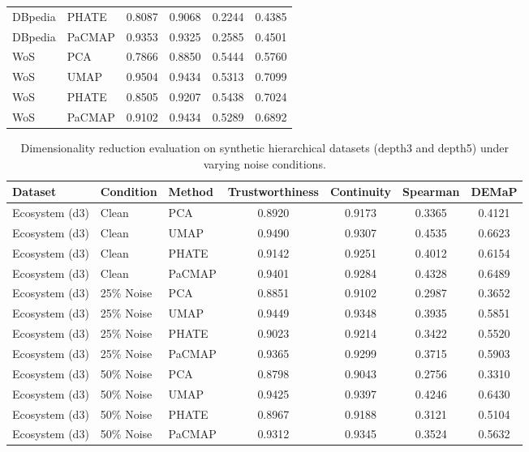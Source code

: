 \begin{table}[t]
\begin{tabular}{llcccc}
    DBpedia & PHATE & 0.8087 & 0.9068 & 0.2244 & 0.4385 \\
    DBpedia & PaCMAP & 0.9353 & 0.9325 & 0.2585 & 0.4501 \\
    \midrule
    WoS & PCA & 0.7866 & 0.8850 & 0.5444 & 0.5760 \\
    WoS & UMAP & 0.9504 & 0.9434 & 0.5313 & 0.7099 \\
    WoS & PHATE & 0.8505 & 0.9207 & 0.5438 & 0.7024 \\
    WoS & PaCMAP & 0.9102 & 0.9434 & 0.5289 & 0.6892 \\
    \bottomrule
    \end{tabular}
\end{table}

\begin{table}[t]
    \centering
    \caption{Dimensionality reduction evaluation on synthetic hierarchical datasets (depth3 and depth5) under varying noise conditions.}
    \label{tab:dr_synthetic}
    \begin{tabular}{lllcccc}
    \toprule
    Dataset & Condition & Method & Trustworthiness & Continuity & Spearman & DEMaP \\
    \midrule
    
    Ecosystem (d3) & Clean & PCA & 0.8920 & 0.9173 & 0.3365 & 0.4121 \\
    Ecosystem (d3) & Clean & UMAP & 0.9490 & 0.9307 & 0.4535 & 0.6623 \\
    Ecosystem (d3) & Clean & PHATE & 0.9142 & 0.9251 & 0.4012 & 0.6154 \\
    Ecosystem (d3) & Clean & PaCMAP & 0.9401 & 0.9284 & 0.4328 & 0.6489 \\
    
    Ecosystem (d3) & 25\% Noise & PCA & 0.8851 & 0.9102 & 0.2987 & 0.3652 \\
    Ecosystem (d3) & 25\% Noise & UMAP & 0.9449 & 0.9348 & 0.3935 & 0.5851 \\
    Ecosystem (d3) & 25\% Noise & PHATE & 0.9023 & 0.9214 & 0.3422 & 0.5520 \\
    Ecosystem (d3) & 25\% Noise & PaCMAP & 0.9365 & 0.9299 & 0.3715 & 0.5903 \\
    
    Ecosystem (d3) & 50\% Noise & PCA & 0.8798 & 0.9043 & 0.2756 & 0.3310 \\
    Ecosystem (d3) & 50\% Noise & UMAP & 0.9425 & 0.9397 & 0.4246 & 0.6430 \\
    Ecosystem (d3) & 50\% Noise & PHATE & 0.8967 & 0.9188 & 0.3121 & 0.5104 \\
    Ecosystem (d3) & 50\% Noise & PaCMAP & 0.9312 & 0.9345 & 0.3524 & 0.5632 \\
    

\end{tabular}
\end{table}
